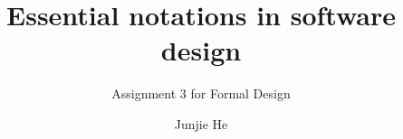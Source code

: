 \documentclass[sigchi,12]{acmart}  %
\begin{document}
\title{Essential notations in software design}
\subtitle{Assignment 3 for Formal Design}
\author{Junjie He}
\maketitle



\end{document}
